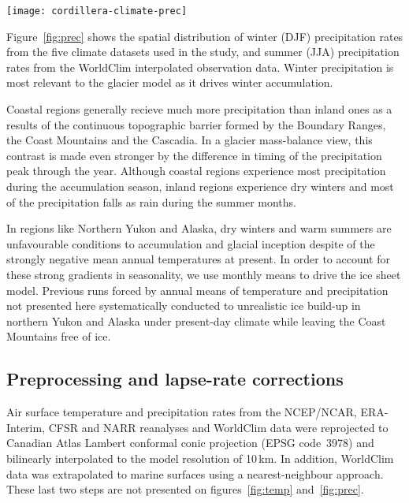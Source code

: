 \begin{figure*}[t]
	\vspace*{2mm}
	\begin{center}
		\texttt{[image: cordillera-climate-prec]}
	\end{center}
	\caption{Winter precipitation rate maps from the five datasets used in this study and summer precipitation map from the WorldClim dataset.}
	\label{fig:prec}
\end{figure*}

Figure~\ref{fig:prec} shows the spatial distribution of winter (DJF) precipitation rates from the five climate datasets used in the study, and summer (JJA) precipitation rates from the WorldClim interpolated observation data. Winter precipitation is most relevant to the glacier model as it drives winter accumulation.

Coastal regions generally recieve much more precipitation than inland ones as a results of the continuous topographic barrier formed by the Boundary Ranges, the Coast Mountains and the Cascadia. In a glacier mass-balance view, this contrast is made even stronger by the difference in timing of the precipitation peak through the year. Although coastal regions experience most precipitation during the accumulation season, inland regions experience dry winters and most of the precipitation falls as rain during the summer months.

In regions like Northern Yukon and Alaska, dry winters and warm summers are unfavourable conditions to accumulation and glacial inception despite of the strongly negative mean annual temperatures at present. In order to account for these strong gradients in seasonality, we use monthly means to drive the ice sheet model. Previous runs forced by annual means of temperature and precipitation not presented here systematically conducted to unrealistic ice build-up in northern Yukon and Alaska under present-day climate while leaving the Coast Mountains free of ice.


\subsection{Preprocessing and lapse-rate corrections}

Air surface temperature and precipitation rates from the NCEP/NCAR, ERA-Interim, CFSR and NARR reanalyses and WorldClim data were reprojected to Canadian Atlas Lambert conformal conic projection (EPSG code~3978) and bilinearly interpolated to the model resolution of 10\,km. In addition, WorldClim data was extrapolated to marine surfaces using a nearest-neighbour approach. These last two steps are not presented on figures~\ref{fig:temp} and~\ref{fig:prec}.

